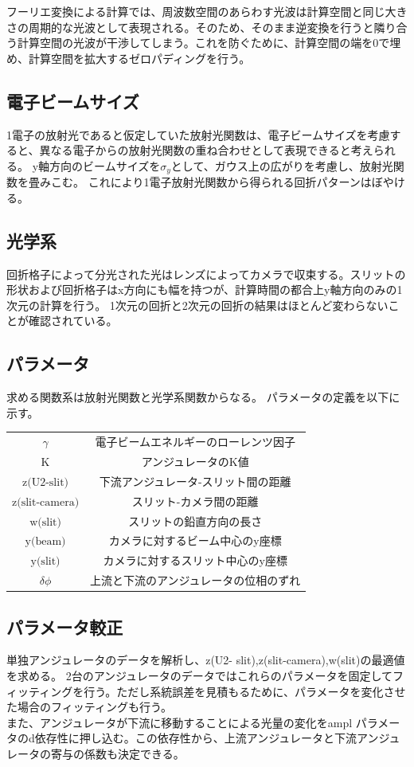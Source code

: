 \documentclass[a4paper,11pt,uplatex]{jsbook}
\begin{document}
フーリエ変換による計算では、周波数空間のあらわす光波は計算空間と同じ大きさの周期的な光波として表現される。そのため、そのまま逆変換を行うと隣り合う計算空間の光波が干渉してしまう。これを防ぐために、計算空間の端を0で埋め、計算空間を拡大するゼロパディングを行う。

\subsection{電子ビームサイズ}
1電子の放射光であると仮定していた放射光関数は、電子ビームサイズを考慮すると、異なる電子からの放射光関数の重ね合わせとして表現できると考えられる。
y軸方向のビームサイズを$\sigma_y$として、ガウス上の広がりを考慮し、放射光関数を畳みこむ。
これにより1電子放射光関数から得られる回折パターンはぼやける。
\subsection{光学系}
回折格子によって分光された光はレンズによってカメラで収束する。スリットの形状および回折格子はx方向にも幅を持つが、計算時間の都合上y軸方向のみの1次元の計算を行う。
1次元の回折と2次元の回折の結果はほとんど変わらないことが確認されている。
\subsection{パラメータ}
求める関数系は放射光関数と光学系関数からなる。
パラメータの定義を以下に示す。
\begin{table}[h]
\centering
\begin{tabular}{c|c}
  $\gamma$ & 電子ビームエネルギーのローレンツ因子 \\
  $\text{K}$ & アンジュレータのK値 \\
  $\text{z(U2-slit)}$ & 下流アンジュレータ-スリット間の距離 \\
  $\text{z(slit-camera)}$ & スリット-カメラ間の距離 \\
  $\text{w(slit)}$ & スリットの鉛直方向の長さ \\
  $\text{y(beam)}$ & カメラに対するビーム中心のy座標 \\
  $\text{y(slit)}$ & カメラに対するスリット中心のy座標 \\
  $\delta \phi$ & 上流と下流のアンジュレータの位相のずれ\\
\end{tabular}
\end{table}

\subsection{パラメータ較正}
単独アンジュレータのデータを解析し、z(U2- slit),z(slit-camera),w(slit)の最適値を求める。
2台のアンジュレータのデータではこれらのパラメータを固定してフィッティングを行う。ただし系統誤差を見積もるために、パラメータを変化させた場合のフィッティングも行う。\\
また、アンジュレータが下流に移動することによる光量の変化をampl パラメータのd依存性に押し込む。この依存性から、上流アンジュレータと下流アンジュレータの寄与の係数も決定できる。
\end{document}
